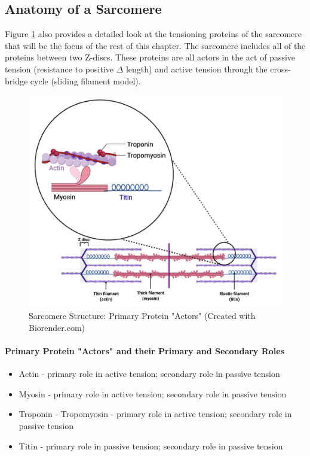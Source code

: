 \subsection{Anatomy of a Sarcomere}
Figure \ref{fig:Sarcomere_Structure} also provides a detailed look at the tensioning proteins of the sarcomere that will be the focus of the rest of this chapter. The sarcomere includes all of the proteins between two Z-discs. These proteins are all actors in the act of passive tension (resistance to positive $\Delta$ length) and active tension through the cross-bridge cycle (sliding filament model).

\begin{figure}[!ht]
    \centering
    \includegraphics[width=1\linewidth]{./figure/Sarcomere_Structure.png}
    \caption{Sarcomere Structure: Primary Protein "Actors" \footnotesize{(Created with Biorender.com)}}
    \label{fig:Sarcomere_Structure}
\end{figure}

\paragraph{Primary Protein "Actors" and their Primary and Secondary Roles}
\begin{itemize}
\item Actin - primary role in active tension; secondary role in passive tension
\item Myosin - primary role in active tension; secondary role in passive tension
\item Troponin - Tropomyosin - primary role in active tension; secondary role in passive tension
\item Titin - primary role in passive tension; secondary role in passive tension
\end{itemize}

